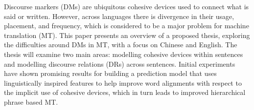 Discourse markers (DMs) are ubiquitous cohesive devices used to connect what is said or written. However, across languages there is divergence in their usage, placement, and frequency, which is considered to be a major problem for machine translation (MT). This paper presents an overview of a proposed thesis, exploring the difficulties around DMs in MT, with a focus on Chinese and English. The thesis will examine two main areas: modelling cohesive devices within sentences and modelling discourse relations (DRs) across sentences. Initial experiments have shown promising results for building a prediction model that uses linguistically inspired features to help improve word alignments with respect to the implicit use of cohesive devices, which in turn leads to improved hierarchical phrase based MT.
